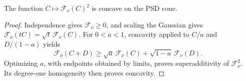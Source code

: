 \begin{corollary}\label{cor:square}
The function $C\mapsto\mathcal F_\nu(C)^2$ is concave on the PSD cone.
\end{corollary}
\begin{proof}
Independence gives $\mathcal F_\nu\geq0$, and scaling the Gaussian gives
$\mathcal F_\nu(tC)=\sqrt t\,\mathcal F_\nu(C)$.
For $0<a<1$, concavity applied to $C/a$ and $D/(1-a)$ yields
\[
 \mathcal F_\nu(C+D)\geq
 \sqrt a\,\mathcal F_\nu(C)+\sqrt{1-a}\,\mathcal F_\nu(D).
\]
Optimizing $a$, with endpoints obtained by limits, proves superadditivity
of $\mathcal F_\nu^2$. Its degree-one homogeneity then proves concavity.
\end{proof}

